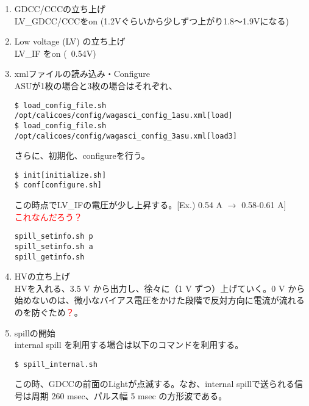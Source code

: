 \begin{enumerate}
\item GDCC/CCCの立ち上げ\\
LV\_GDCC/CCCをon (1.2Vぐらいから少しずつ上がり1.8〜1.9Vになる)

\item Low voltage (LV) の立ち上げ\\
LV\_IF をon (~0.54V)

\item xmlファイルの読み込み・Configure\\
ASUが1枚の場合と3枚の場合はそれぞれ、
\begin{screen}
\begin{verbatim}
$ load_config_file.sh /opt/calicoes/config/wagasci_config_1asu.xml[load]
$ load_config_file.sh /opt/calicoes/config/wagasci_config_3asu.xml[load3]
\end{verbatim}
\end{screen}
さらに、初期化、configureを行う。
\begin{screen}
\begin{verbatim}
$ init[initialize.sh]
$ conf[configure.sh]
\end{verbatim}
\end{screen}
この時点でLV\_IFの電圧が少し上昇する。[Ex.) 0.54 A $\to$ 0.58-0.61 A]\\

\textcolor{red}{これなんだろう？}
\begin{screen}
\begin{verbatim}
spill_setinfo.sh p 
spill_setinfo.sh a
spill_getinfo.sh
\end{verbatim}
\end{screen}

\item HVの立ち上げ\\
HVを入れる、3.5 V から出力し、徐々に（1 V ずつ）上げていく。0 V から始めないのは、微小なバイアス電圧をかけた段階で反対方向に電流が流れるのを防ぐため\textcolor{red}{？}。

\item spillの開始\\
internal spill を利用する場合は以下のコマンドを利用する。
\begin{screen}
\begin{verbatim}
$ spill_internal.sh
\end{verbatim}
\end{screen}
この時、GDCCの前面のLightが点滅する。なお、internal spillで送られる信号は周期 260 msec、パルス幅 5 msec の方形波である。\\


\end{enumerate}
